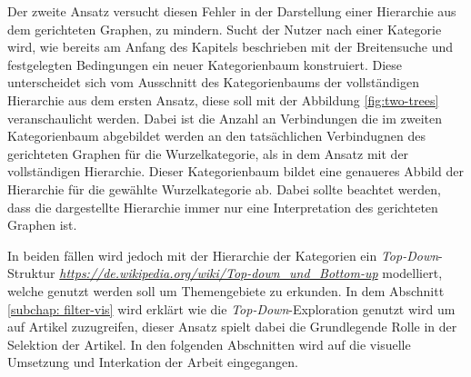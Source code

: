 Der zweite Ansatz versucht diesen Fehler in der Darstellung einer Hierarchie aus dem gerichteten Graphen, zu mindern.
Sucht der Nutzer nach einer Kategorie wird, wie bereits am Anfang des Kapitels beschrieben mit der Breitensuche und festgelegten Bedingungen ein neuer Kategorienbaum konstruiert.
Diese unterscheidet sich vom Ausschnitt des Kategorienbaums der vollständigen Hierarchie aus dem ersten Ansatz, diese soll mit der Abbildung \ref{fig:two-trees} veranschaulicht werden.
Dabei ist die Anzahl an Verbindungen die im zweiten Kategorienbaum abgebildet werden an den tatsächlichen Verbindugnen des gerichteten Graphen für die Wurzelkategorie, als in dem Ansatz mit der vollständigen Hierarchie.
Dieser Kategorienbaum bildet eine genaueres Abbild der Hierarchie für die gewählte Wurzelkategorie ab.
Dabei sollte beachtet werden, dass die dargestellte Hierarchie immer nur eine Interpretation des gerichteten Graphen ist.

In beiden fällen wird jedoch mit der Hierarchie der Kategorien ein \emph{Top-Down}-Struktur \emph{\url{https://de.wikipedia.org/wiki/Top-down_und_Bottom-up}} modelliert, welche genutzt werden soll um Themengebiete zu erkunden.
In dem Abschnitt \ref{subchap: filter-vis} wird erklärt wie die \emph{Top-Down}-Exploration genutzt wird um auf Artikel zuzugreifen, dieser Ansatz spielt dabei die Grundlegende Rolle in der Selektion der Artikel.
In den folgenden Abschnitten wird auf die visuelle Umsetzung und Interkation der Arbeit eingegangen.

